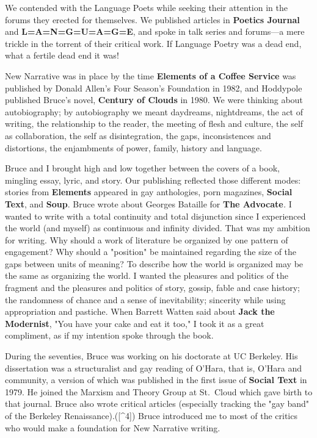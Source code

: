 We contended with the Language Poets while seeking their attention in
the forums they erected for themselves. We published articles in
\textbf{Poetics Journal} and \textbf{L=A=N=G=U=A=G=E}, and spoke in talk
series and forums---a mere trickle in the torrent of their critical
work. If Language Poetry was a dead end, what a fertile dead end it was!

New Narrative was in place by the time \textbf{Elements of a Coffee
Service} was published by Donald Allen's Four Season's Foundation in
1982, and Hoddypole published Bruce's novel, \textbf{Century of Clouds}
in 1980. We were thinking about autobiography; by autobiography we meant
daydreams, nightdreams, the act of writing, the relationship to the
reader, the meeting of flesh and culture, the self as collaboration, the
self as disintegration, the gaps, inconsistences and distortions, the
enjambments of power, family, history and language.

Bruce and I brought high and low together between the covers of a book,
mingling essay, lyric, and story. Our publishing reflected those
different modes: stories from \textbf{Elements} appeared in gay
anthologies, porn magazines, \textbf{Social Text}, and \textbf{Soup}.
Bruce wrote about Georges Bataille for \textbf{The Advocate}\emph{. } I
wanted to write with a total continuity and total disjunction since I
experienced the world (and myself) as continuous and infinity divided.
That was my ambition for writing. Why should a work of literature be
organized by one pattern of engagement? Why should a "position" be
maintained regarding the size of the gaps between units of meaning? To
describe how the world is organized may be the same as organizing the
world. I wanted the pleasures and politics of the fragment and the
pleasures and politics of story, gossip, fable and case history; the
randomness of chance and a sense of inevitability; sincerity while using
appropriation and pastiche. When Barrett Watten said about \textbf{Jack
the Modernist}, "You have your cake and eat it too," I took it as a
great compliment, as if my intention spoke through the book.

During the seventies, Bruce was working on his doctorate at UC Berkeley.
His dissertation was a structuralist and gay reading of O'Hara, that is,
O'Hara and community, a version of which was published in the first
issue of \textbf{Social Text} in 1979. He joined the Marxism and Theory
Group at St.~Cloud which gave birth to that journal. Bruce also wrote
critical articles (especially tracking the "gay band" of the Berkeley
Renaissance).({[}\^{}4{]}) Bruce introduced me to most of the critics
who would make a foundation for New Narrative writing.

